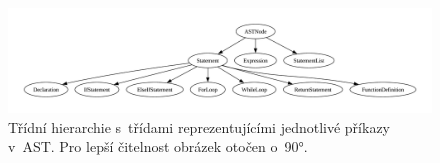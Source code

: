 \begin{figure}[h]
	\centering
	\vspace{13em}
	\begin{sideways}
		\begin{minipage}{\textwidth}
    		\includegraphics[width=1.4\textwidth]{obrazky-figures/hierarchy_statement.pdf}
			\vspace{1em}
		\end{minipage}
	\end{sideways}
    \caption{Třídní hierarchie s~třídami reprezentujícími jednotlivé příkazy v~AST. Pro lepší čitelnost obrázek otočen o~90°.}
	\label{fig_hierarchie_statement}
\end{figure}








%
